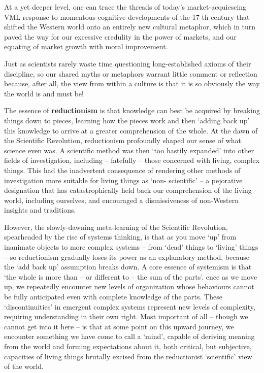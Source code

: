 \documentclass[
]{book}
\begin{document}
At a yet deeper level, one can trace the threads of today's market-acquiescing VML response to
momentous cognitive developments of the 17 th century that shifted the Western world onto an
entirely new cultural metaphor, which in turn paved the way for our excessive credulity in the power
of markets, and our equating of market growth with moral improvement.

Just as scientists rarely waste time questioning long-established axioms of their
discipline, so our shared myths or metaphors warrant little comment or reflection because, after all,
the view from within a culture is that it is so obviously the way the world is and must be!

The essence of \textbf{reductionism} is that knowledge can best be acquired by
breaking things down to pieces, learning how the pieces work and then `adding back up' this
knowledge to arrive at a greater comprehension of the whole.
At the dawn of the Scientific Revolution, reductionism profoundly shaped our sense of what science
even was.
A scientific method was then `too hastily expanded' into other fields of investigation,
including -- fatefully -- those concerned with living, complex things. This had the inadvertent
consequence of rendering other methods of investigation more suitable for living things as `non-
scientific' -- a pejorative designation that has catastrophically held back our comprehension of the
living world, including ourselves, and encouraged a dismissiveness of non-Western insights and
traditions.

However, the slowly-dawning meta-learning of the Scientific Revolution, spearheaded by the rise of
systems thinking, is that as you move `up' from inanimate objects to more complex systems -- from
`dead' things to `living' things -- so reductionism gradually loses its power as an explanatory method,
because the `add back up' assumption breaks down. A core essence of systemism is that `the whole is
more than -- or different to -- the sum of the parts'.
ence as we move up, we repeatedly encounter
new levels of organization whose behaviours cannot be fully anticipated even with complete
knowledge of the parts. These `discontinuities' in emergent complex systems represent new levels of
complexity, requiring understanding in their own right. Most important of all -- though we cannot get
into it here -- is that at some point on this upward journey, we encounter something we have come to
call a `mind', capable of deriving meaning from the world and forming expectations about it, both
critical, but subjective, capacities of living things brutally excised from the reductionist `scientific'
view of the world.
\end{document}
